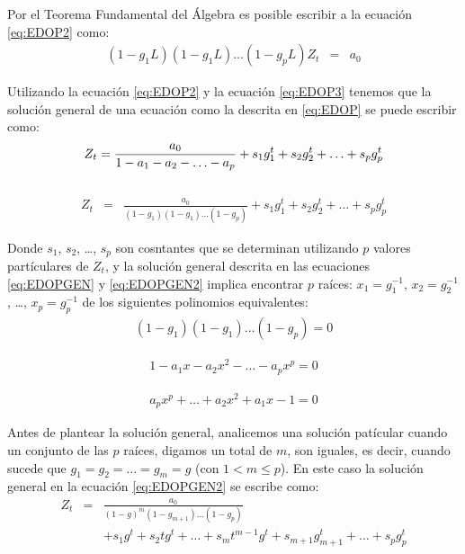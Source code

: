 \documentclass[
]{book}
\begin{document}
Por el Teorema Fundamental del Álgebra es posible escribir a la ecuación \eqref{eq:EDOP2} como:
\begin{eqnarray}
    (1 - g_1 L)(1 - g_1 L) \ldots (1 - g_p L) Z_t & = & a_0
    \label{eq:EDOP3}
\end{eqnarray}

Utilizando la ecuación \eqref{eq:EDOP2} y la ecuación \eqref{eq:EDOP3} tenemos que la solución general de una ecuación como la descrita en \eqref{eq:EDOP} se puede escribir como:
\begin{equation}
    Z_t  =  \frac{a_0}{1 - a_1 - a_2 - \ldots - a_p} + s_1 g^t_1 + s_2 g^t_2 + \ldots + s_p g^t_p \\
    \label{eq:EDOPGEN}
\end{equation}\\
\begin{eqnarray}
    Z_t & = & \frac{a_0}{(1 - g_1)(1 - g_1) \ldots (1 - g_p)} + s_1 g^t_1 + s_2 g^t_2 + \ldots + s_p g^t_p 
    \label{eq:EDOPGEN2}
\end{eqnarray}

Donde \(s_1\), \(s_2\), \ldots, \(s_p\) son cosntantes que se determinan utilizando \(p\) valores partículares de \(Z_t\), y la solución general descrita en las ecuaciones \eqref{eq:EDOPGEN} y \eqref{eq:EDOPGEN2} implica encontrar \(p\) raíces: \(x_1 = g^{-1}_1\), \(x_2 = g^{-1}_2\), \ldots, \(x_p = g^{-1}_p\) de los siguientes polinomios equivalentes:
\begin{eqnarray}
    (1 - g_1)(1 - g_1) \ldots (1 - g_p) = 0
    \label{eq:POLGEN1}
\end{eqnarray}

\begin{eqnarray}
    1 - a_1 x - a_2 x^2 - \ldots - a_p x^p = 0
    \label{eq:POLGEN2}
\end{eqnarray}

\begin{eqnarray}
    a_p x^p + \ldots + a_2 x^2 + a_1 x - 1 = 0
    \label{eq:POLGEN3}
\end{eqnarray}

Antes de plantear la solución general, analicemos una solución patícular cuando un conjunto de las \(p\) raíces, digamos un total de \(m\), son iguales, es decir, cuando sucede que \(g_1 = g_2 = \ldots = g_m = g\) (con \(1 < m \leq p\)). En este caso la solución general en la ecuación \eqref{eq:EDOPGEN2} se escribe como:
\begin{eqnarray}
    Z_t & = & \frac{a_0}{(1 - g)^m(1 - g_{m+1}) \ldots (1 - g_p)} \nonumber \\ 
    & & + s_1 g^t + s_2 t g^t + \ldots + s_m t^{m-1} g^t + s_{m+1} g^t_{m+1} + \ldots + s_{p} g^t_{p}
    \label{eq:EDOPGEN3}
\end{eqnarray}
\end{document}
